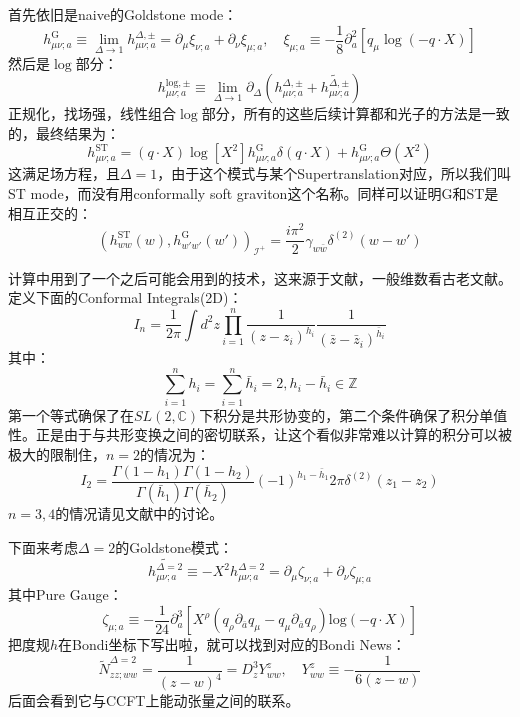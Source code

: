 首先依旧是naive的Goldstone mode：
\begin{equation}
	h_{\mu\nu;a}^\mathrm{G}\equiv\lim_{\Delta\to1}h_{\mu\nu;a}^{\Delta,\pm}=\partial_\mu\xi_{\nu;a}+\partial_\nu\xi_{\mu;a},\quad\xi_{\mu;a}\equiv-\frac18\partial_a^2[q_\mu\log(-q\cdot X)]
\end{equation}
然后是$\log$部分：
\begin{equation}
	h_{\mu\nu;a}^{\mathrm{log},\pm}\equiv\lim_{\Delta\to1}\partial_\Delta\left(h_{\mu\nu;a}^{\Delta,\pm}+\widetilde{h_{\mu\nu;a}^{\Delta,\pm}}\right)
\end{equation}
正规化，找场强，线性组合$\log$部分，所有的这些后续计算都和光子的方法是一致的，最终结果为：
\begin{equation}
	h_{\mu\nu;a}^\mathrm{ST}=(q\cdot X)\log[X^2]h_{\mu\nu;a}^\mathrm{G}\delta(q\cdot X)+h_{\mu\nu;a}^\mathrm{G}\Theta\left(X^2\right)
\end{equation}
这满足场方程，且$\Delta=1$，由于这个模式与某个Supertranslation对应，所以我们叫ST mode，而没有用conformally soft graviton这个名称。同样可以证明G和ST是相互正交的：
\begin{equation}
	(h_{ww}^\mathrm{ST}(w),h_{w'w'}^\mathrm{G}(w'))_{\mathcal{I}^+}=\frac{i\pi^2}2\gamma_{w\bar{w}}\delta^{(2)}(w-w')
\end{equation}
\begin{remark}
	计算中用到了一个之后可能会用到的技术，这来源于文献\cite{Dolan:2011dv}，一般维数看古老文献\cite{Symanzik:1972wj}。定义下面的Conformal Integrals(2D)：
	\begin{equation}
		I_n=\frac1{2\pi}\int d^2z\prod_{i=1}^n\frac1{(z-z_i)^{h_i}}\frac1{(\bar{z}-\bar{z}_i)^{\bar{h}_i}}
	\end{equation}
	其中：
	$$
		\sum_{i=1}^nh_i=\sum_{i=1}^n\bar{h}_i=2,h_i-\bar{h}_i\in\mathbb{Z}
	$$
	第一个等式确保了在$SL(2,\mathbb{C})$下积分是共形协变的，第二个条件确保了积分单值性。正是由于与共形变换之间的密切联系，让这个看似非常难以计算的积分可以被极大的限制住，$n=2$的情况为：
	\begin{equation}
		I_2=\frac{\Gamma(1-h_1)\Gamma(1-h_2)}{\Gamma(\bar{h}_1)\Gamma(\bar{h}_2)}(-1)^{h_1-\bar{h}_1}2\pi\delta^{(2)}(z_1-z_2)
	\end{equation}
	$n=3,4$的情况请见文献中的讨论。
\end{remark}
下面来考虑$\Delta=2$的Goldstone模式：
\begin{equation}
	\widetilde{h_{\mu\nu;a}^{\Delta=2}}\equiv-X^2h_{\mu\nu;a}^{\Delta=2}=\partial_\mu\zeta_{\nu;a}+\partial_\nu\zeta_{\mu;a}
\end{equation}
其中Pure Gauge：
\begin{equation}
	\zeta_{\mu;a}\equiv-\frac1{24}\partial_a^3[X^\rho(q_\rho\partial_{\bar{a}}q_\mu-q_\mu\partial_{\bar{a}}q_\rho)\mathrm{log}(-q\cdot X)]
\end{equation}
把度规$h$在Bondi坐标下写出啦，就可以找到对应的Bondi News：
\begin{equation}
	\widetilde{N}_{zz;ww}^{\Delta=2}=\frac1{(z-w)^4}=D_z^3Y^z_{ww},\quad Y_{ww}^z\equiv-\frac1{6(z-w)}
\end{equation}
后面会看到它与CCFT上能动张量之间的联系。
